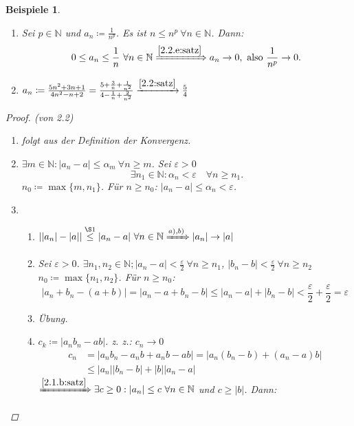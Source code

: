 \documentclass[titlepage,ngerman,a4paper,headsepline]{scrartcl}
\newcommand{\N}{\mathbb{N}}
\theoremstyle{named}
\theoremstyle{dotless}
\newtheorem*{beispiele}{Beispiele}
\begin{document}
\begin{beispiele} \
	\begin{enumerate}
		\item Sei $p \in \N$ und $a_{n} \coloneqq \frac{1}{n^{p}}$. Es ist $n \leq n^{p} ~\forall n \in \N$. Dann: 
			$$ 0 \leq a_{n} \leq \frac{1}{n} ~\forall n \in \N \xRightarrow[]{\ref{2.2.e:satz}} a_{n} \rightarrow 0, \text{ also } \frac{1}{n^{p}} \rightarrow 0. $$
		\item $a_{n} \coloneqq \frac{5n^{2} + 3n + 1}{4n^{2} - n + 2} = \frac{5 + \frac{3}{n} + \frac{1}{n^{2}}}{4 - \frac{1}{n} + \frac{2}{n^{2}}} \xrightarrow[]{\ref{2.2:satz}} \frac{5}{4}$
	\end{enumerate}
	
	\begin{proof}(von 2.2) ~\
		\begin{enumerate}
			\item folgt aus der Definition der Konvergenz.
			\item $\exists m \in \N: |a_{n} - a | \leq \alpha_{m} ~\forall n \geq m$. Sei $\varepsilon > 0$
				$$
		 		\exists n_{1} \in \N: \alpha_{n} < \varepsilon \quad \forall n \geq n_{1}.
		 		$$
		 		$n_{0} \coloneqq \max \{ m , n_{1} \}$. Für $n \geq n_{0}$: $|a_{n} - a| \leq \alpha_{n} < \varepsilon$.
			\item \begin{enumerate}
				\item $| |a_{n}| - |a|| \overset{\S 1}{\leq} |a_{n} - a| ~\forall n \in \N \xRightarrow[]{a), b)} |a_{n}| \rightarrow |a|$
				\item Sei $\varepsilon > 0$. $\exists n_{1}, n_{2} \in \N; |a_{n} - a| < \frac{\varepsilon}{2} ~\forall n \geq n_{1}$, $|b_{n} - b| < \frac{\varepsilon}{2} ~\forall n \geq n_{2}$ \\
					$n_{0} \coloneqq \max \{ n_{1}, n_{2} \}$. Für $n \geq n_{0}$:
					$$
						|a_{n} + b_{n} - (a + b)| = |a_{n} - a + b_{n} - b| \leq |a_{n} - a| + |b_{n} - b| < \frac{\varepsilon}{2} + \frac{\varepsilon}{2} = \varepsilon
					$$
				\item Übung.
				\item $c_{k} \coloneqq |a_{n} b_{n} - ab|$. z. z.: $c_{n} \rightarrow 0$
					\begin{align*}
						c_{n} & = |a_{n}b_{n} - a_{n}b + a_{n}b - ab| = |a_{n}(b_{n} - b)+ (a_{n} - a)b| \\
							  & \leq |a_{n}||b_{n} - b| + |b||a_{n}-a|
					\end{align*}
					$\xRightarrow[]{\ref{2.1.b:satz}} \exists c \geq 0 : |a_{n}| \leq c ~\forall n \in \N$ und $c \geq |b|$. Dann:

\end{enumerate}
\end{enumerate}
\end{proof}
\end{beispiele}
\end{document}
